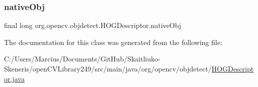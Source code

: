 \mbox{\label{classorg_1_1opencv_1_1objdetect_1_1_h_o_g_descriptor_a97c4daabbef26778df6a2fb4d6863e9d}} 
\subsubsection{\texorpdfstring{native\+Obj}{nativeObj}}
{\footnotesize\ttfamily final long org.\+opencv.\+objdetect.\+H\+O\+G\+Descriptor.\+native\+Obj\hspace{0.3cm}{\ttfamily [protected]}}



The documentation for this class was generated from the following file\+:\begin{DoxyCompactItemize}
\item 
C\+:/\+Users/\+Marcius/\+Documents/\+Git\+Hub/\+Skaitliuko-\/\+Skeneris/open\+C\+V\+Library249/src/main/java/org/opencv/objdetect/\mbox{\hyperlink{_h_o_g_descriptor_8java}{H\+O\+G\+Descriptor.\+java}}\end{DoxyCompactItemize}
